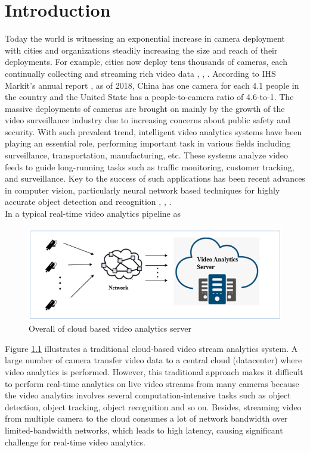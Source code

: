 \chapter{Introduction}  %
Today the world is witnessing an exponential increase in camera deployment ~\citep{ananthanarayanan2019demo} with cities and organizations steadily increasing the size and reach of their deployments. For example, cities now deploy tens thousands of cameras, each continually collecting and streaming rich video data \cite{ref0}, \cite{ref1}, \cite{ref2}. According to IHS Markit’s annual report \cite{oliverreport}, as of 2018, China has one camera for each 4.1 people in the country and the United State has a people-to-camera ratio of 4.6-to-1. The massive deployments of cameras are brought on mainly by the growth of the video surveillance industry due to increasing concerns about public safety and security. With such prevalent trend, intelligent video analytics systems have been playing an essential role, performing important task in various fields including surveillance, transportation, manufacturing, etc. These systems analyze video feeds to guide long-running tasks such as traffic monitoring, customer tracking, and surveillance. Key to the success of such applications has been recent advances in computer vision, particularly neural network based techniques for highly accurate object detection and recognition \cite{cai2015learning}, \cite{krizhevsky2017imagenet}, \cite{li2015convolutional}.\\
In a typical real-time video analytics pipeline as 
\begin{figure}
\centering
 \includegraphics[width=1.0\linewidth]{Figures/cloud.png}
 \caption{Overall of cloud based video analytics server}
 \label{fig:overall}
\end{figure}
Figure \ref{fig:overall} illustrates a traditional cloud-based video stream analytics system. A large number of camera transfer video data to a central cloud (datacenter) where video analytics is performed. However, this traditional approach makes it difficult to perform real-time analytics on live video streams from many cameras because the video analytics involves several computation-intensive tasks such as object detection, object tracking, object recognition and so on. Besides, streaming video from multiple camera to the cloud consumes a lot of network bandwidth over limited-bandwidth networks, which leads to high latency, causing significant challenge for real-time video analytics.\\
